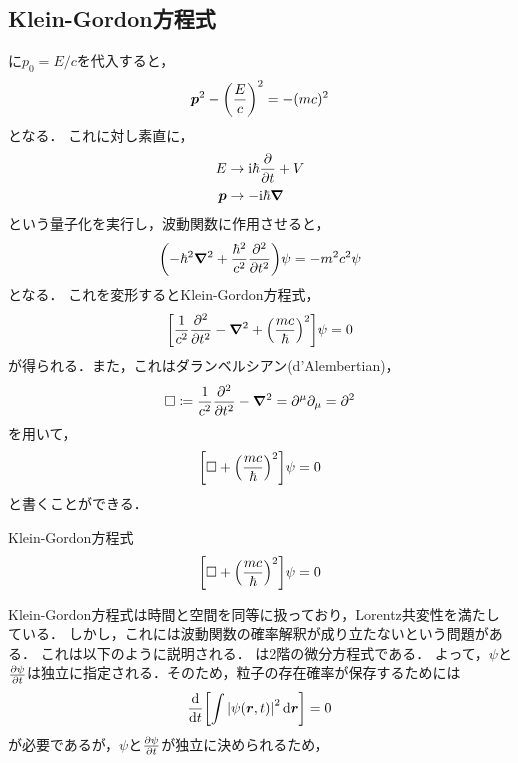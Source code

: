 \documentclass{report}
\begin{document}
  \subsection{Klein-Gordon方程式}
    に$p_0 = E/c$を代入すると，
    \begin{align}
      \bm{p}^2 - \qty(\frac{E}{c})^2 = -(mc)^2
    \end{align}
    となる．
    これに対し素直に，
    \begin{align}
      E &\to \mathrm{i}\hbar\pdv{t} + V \\ 
      \bm{p} &\to - \mathrm{i}\hbar\grad 
    \end{align}
    という量子化を実行し，波動関数に作用させると，
    \begin{align}
      \qty(-\hbar^2\grad^2 + \frac{\hbar^2}{c^2}\pdv[2]{t})\psi = -m^2c^2\psi
    \end{align}
    となる．
    これを変形するとKlein-Gordon方程式，
    \begin{align}
      \qty[\frac{1}{c^2}\pdv[2]{t} - \grad^2 + \qty(\frac{mc}{\hbar})^2]\psi = 0 
    \end{align}
    が得られる．また，これはダランベルシアン(d'Alembertian)，
    \begin{align}
      \Box \coloneqq \frac{1}{c^2}\pdv[2]{t} - \grad^2 = \partial^\mu\partial_\mu = \partial^2
    \end{align}
    を用いて，
    \begin{align}
      \qty[\Box + \qty(\frac{mc}{\hbar})^2]\psi = 0
    \end{align}
    と書くことができる．
    \begin{itembox}[l]{Klein-Gordon方程式}
      \begin{align}
        \qty[\Box + \qty(\frac{mc}{\hbar})^2]\psi = 0 \label{Klein-Gordon-equation}
      \end{align}
    \end{itembox}
    \par
    Klein-Gordon方程式は時間と空間を同等に扱っており，Lorentz共変性を満たしている．
    しかし，これには波動関数の確率解釈が成り立たないという問題がある．
    これは以下のように説明される．
    は2階の微分方程式である．
    よって，$\psi$と$\pdv{\psi}{t}$は独立に指定される．そのため，粒子の存在確率が保存するためには
    \begin{align}
      \dv{t}\qty[\int \abs{\psi(\bm{r}, t)}^2 \dd{\bm{r}}] = 0
    \end{align}
    が必要であるが，$\psi$と$\pdv{\psi}{t}$が独立に決められるため，
\end{document}
